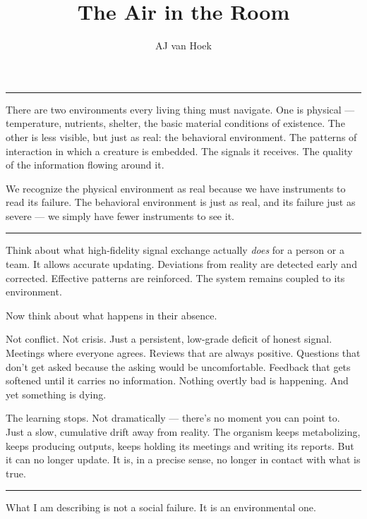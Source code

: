 \documentclass[12pt,letterpaper]{article}
\title{\textbf{The Air in the Room}}
\author{AJ van Hoek}
\date{}
\begin{document}
\maketitle

\begin{center}
\rule{\textwidth}{0.4pt}
\end{center}

There are two environments every living thing must navigate. One is physical — temperature, nutrients, shelter, the basic material conditions of existence. The other is less visible, but just as real: the behavioral environment. The patterns of interaction in which a creature is embedded. The signals it receives. The quality of the information flowing around it.

We recognize the physical environment as real because we have instruments to read its failure. The behavioral environment is just as real, and its failure just as severe — we simply have fewer instruments to see it.

\begin{center}
\rule{\textwidth}{0.4pt}
\end{center}

Think about what high-fidelity signal exchange actually \textit{does} for a person or a team. It allows accurate updating. Deviations from reality are detected early and corrected. Effective patterns are reinforced. The system remains coupled to its environment.

Now think about what happens in their absence.

Not conflict. Not crisis. Just a persistent, low-grade deficit of honest signal. Meetings where everyone agrees. Reviews that are always positive. Questions that don't get asked because the asking would be uncomfortable. Feedback that gets softened until it carries no information. Nothing overtly bad is happening. And yet something is dying.

The learning stops. Not dramatically — there's no moment you can point to. Just a slow, cumulative drift away from reality. The organism keeps metabolizing, keeps producing outputs, keeps holding its meetings and writing its reports. But it can no longer update. It is, in a precise sense, no longer in contact with what is true.

\begin{center}
\rule{\textwidth}{0.4pt}
\end{center}

What I am describing is not a social failure. It is an environmental one.
\end{document}
